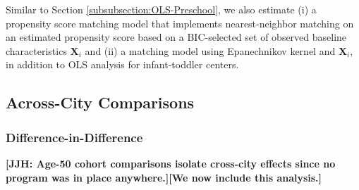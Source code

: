 Similar to Section \ref{subsubsection:OLS-Preschool}, we also estimate (i) a propensity score matching model that implements nearest-neighbor matching on an estimated propensity score based on a BIC-selected set of observed baseline characteristics $\boldsymbol{X}_i$ and (ii) a matching model using Epanechnikov kernel and $\boldsymbol{X}_i$, in addition to OLS analysis for infant-toddler centers. 



\subsection{Across-City Comparisons} \label{sec:across-city-analysis}
\subsubsection{Difference-in-Difference}  \label{subsubsection:DID}

\textbf{[JJH: Age-50 cohort comparisons isolate cross-city effects since no program was in place anywhere.][We now include this analysis.]}

